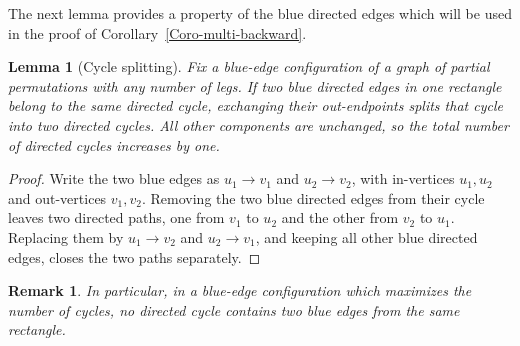 \documentclass[12pt]{article}
\numberwithin{equation}{section}
\theoremstyle{plain}
\newtheorem{lemma}[theorem]{Lemma}
\newtheorem{remark}[theorem]{Remark}
\begin{document}
The next lemma provides a property of the blue directed edges which will be used in the proof of Corollary~\ref{Coro-multi-backward}.

\begin{lemma}[Cycle splitting]\label{Lem-cycle-splitting}
Fix a blue-edge configuration of a graph of partial permutations with any number of legs. If two blue directed edges in one rectangle belong to the same directed cycle, exchanging their out-endpoints splits that cycle into two directed cycles. All other components are unchanged, so the total number of directed cycles increases by one.
\end{lemma}

\begin{proof}
Write the two blue edges as $u_1\to v_1$ and $u_2\to v_2$, with in-vertices $u_1,u_2$ and out-vertices $v_1,v_2$. Removing the two blue directed edges from their cycle leaves two directed paths, one from $v_1$ to $u_2$ and the other from $v_2$ to $u_1$. Replacing them by $u_1\to v_2$ and $u_2\to v_1$, and keeping all other blue directed edges, closes the two paths separately.
\end{proof}

\begin{remark}
In particular, in a blue-edge configuration which maximizes the number of cycles, no directed cycle contains two blue edges from the same rectangle.
\end{remark}
\end{document}
